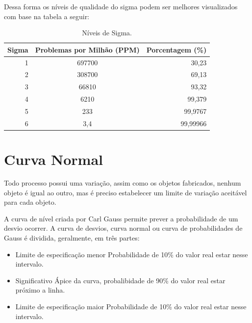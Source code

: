 \documentclass{abnt}
\begin{document}
			Dessa forma os níveis de qualidade do sigma podem ser melhores visualizados com base na tabela a seguir:
			\begin{table}[h]
				\centering

				\begin{tabular}{rcr}
					\toprule
					Sigma & Problemas por Milhão (PPM) & Porcentagem (\%) \\
					\midrule
					 1 & 697700	& 30,23 	\\
					 2 & 308700 & 69,13 	\\
					 3 & 66810 	& 93,32 	\\
					 4 & 6210 	& 99,379 	\\
					 5 & 233 	& 99,9767 	\\
					 6 & 3,4 	& 99,99966 	\\
					\bottomrule		
				\end{tabular}
	
				\label{tab_niveisSigma}
				\caption{Níveis de Sigma.}
				
			\end{table}

		\section {Curva Normal} 
			Todo processo possui uma variação, assim como os objetos fabricados, nenhum objeto é igual ao outro, mas é preciso estabelecer um limite de variação aceitável para cada objeto.
			
			A curva de nível criada por Carl Gauss permite prever a probabilidade de um desvio ocorrer. A curva de desvios, curva normal ou curva de probabilidades de Gauss é dividida, geralmente, em três partes:
			\begin{itemize}
				\item {Limite de especificação menor}
					\subitem Probabilidade de 10\% do valor real estar nesse intervalo. 
				\item {Significativo}
					\subitem Ápice da curva, probalibidade de 90\% do valor real estar próximo a linha. 
				\item {Limite de especificação maior}
					\subitem Probabilidade de 10\% do valor real estar nesse intervalo.
			\end{itemize}
\end{document}
